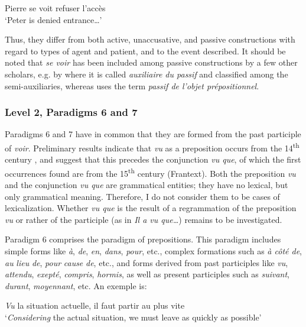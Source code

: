 \documentclass[output=paper]{langsci/langscibook}
\begin{document}
\begin{exe}
    \ex \label{ex:kragh:31} Pierre se voit refuser l’accès\\
    ‘Peter is denied entrance…’
\end{exe}

Thus, they differ from both active, unaccusative, and passive constructions with regard to types of agent and patient, and to the event described. It should be noted that \textit{se voir} has been included among passive constructions by a few other scholars, e.g. by \citet[1051]{GrevisseGoosse2008} where it is called \emph{auxiliaire du passif} and classified among the semi-auxiliaries, whereas \citet[188]{Defrancq2000} uses the term \textit{passif de l’objet prépositionnel}. 


\subsubsection{Level 2, Paradigms 6 and 7} \label{kragh:4.3.2}


Paradigms 6 and 7 have in common that they are formed from the past participle of \textit{voir}. Preliminary results indicate that \textit{vu} as a preposition occurs from the 14\textsuperscript{th} century \citep{Rey1986}, and suggest that this precedes the conjunction \textit{vu que}, of which the first occurrences found are from the 15\textsuperscript{th} century (Frantext). Both the preposition \textit{vu}  and the conjunction \textit{vu que} are grammatical entities; they have no lexical, but only grammatical meaning. Therefore, I do not consider them to be cases of lexicalization. Whether \textit{vu que} is the result of a regrammation of the preposition \textit{vu} or rather of the participle (as in \textit{Il a vu que…}) remains to be investigated.

Paradigm 6 comprises the paradigm of prepositions. This paradigm includes simple forms like \textit{à}, \textit{de}, \textit{en}, \textit{dans}, \textit{pour}, etc., complex formations such as \textit{à côté de}, \textit{au} \textit{lieu} \textit{de}, \textit{pour} \textit{cause} \textit{de}, etc., and forms derived from past participles like \textit{vu}, \textit{attendu}, \textit{exepté}, \textit{compris}, \textit{hormis}, as well as present participles such as \textit{suivant}, \textit{durant}, \textit{moyennant}, etc.  An exemple is:

\begin{exe}
    \ex \label{ex:kragh:32} \emph{Vu} la situation actuelle, il faut partir au plus vite\\
    `\emph{Considering} the actual situation, we must leave as quickly as possible’
\end{exe}
\end{document}
